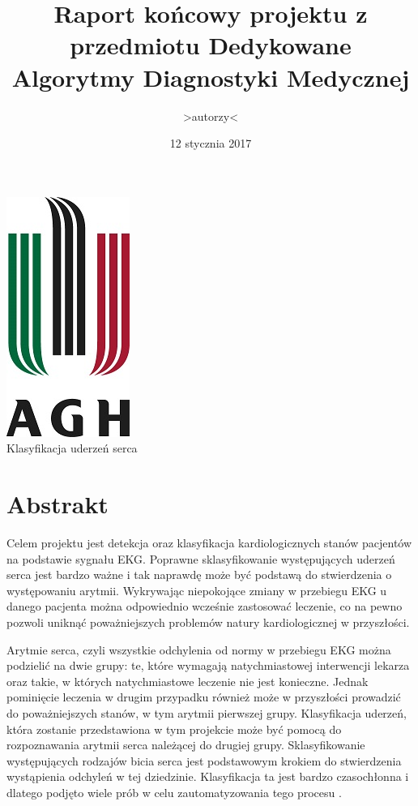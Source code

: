 \documentclass[[10pt,a4paper]{article}
\begin{document}
\title{Raport końcowy projektu z przedmiotu Dedykowane Algorytmy Diagnostyki Medycznej}
\author{>autorzy<}
\date{12 stycznia 2017}
\maketitle


\begin{center}
\includegraphics{logo_agh}\\
\vspace{20mm}
{\LARGE Klasyfikacja uderzeń serca}\\

\end{center}

\newpage
\tableofcontents
\vspace{10mm}
\newpage
\section{Abstrakt}
Celem projektu jest detekcja oraz klasyfikacja kardiologicznych stanów pacjentów na podstawie sygnału EKG. Poprawne sklasyfikowanie występujących uderzeń serca jest bardzo ważne 
i tak naprawdę może być podstawą do stwierdzenia o występowaniu arytmii. Wykrywając niepokojące zmiany w przebiegu EKG u danego pacjenta można odpowiednio wcześnie zastosować leczenie, co na pewno pozwoli uniknąć poważniejszych problemów natury kardiologicznej w przyszłości.  

 Arytmie serca, czyli wszystkie odchylenia od normy w przebiegu EKG można podzielić na dwie grupy: te, które wymagają natychmiastowej interwencji lekarza oraz takie, 
w których natychmiastowe leczenie nie jest konieczne. Jednak pominięcie leczenia w drugim przypadku również może w przyszłości prowadzić do poważniejszych stanów, w tym arytmii pierwszej grupy. 
Klasyfikacja uderzeń, która zostanie przedstawiona w tym projekcie może być pomocą do rozpoznawania arytmii serca należącej do drugiej grupy. Sklasyfikowanie występujących rodzajów bicia serca jest podstawowym krokiem do stwierdzenia wystąpienia odchyleń w tej dziedzinie. Klasyfikacja ta jest bardzo czasochłonna i dlatego podjęto wiele prób w celu zautomatyzowania tego procesu . 
\end{document}
